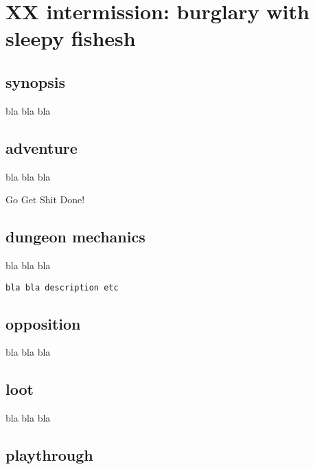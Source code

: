 \section*{XX intermission: burglary with sleepy fishesh}


\subsection*{synopsis}

bla bla bla


\subsection*{adventure}

bla bla bla

\begin{readoutloud}
Go Get Shit Done!
\end{readoutloud}


\subsection*{dungeon mechanics}

bla bla bla

\small \begin{verbatim}
bla bla description etc
\end{verbatim} \normalsize


\subsection*{opposition}

bla bla bla


\subsection*{loot}

bla bla bla


\subsection*{playthrough}

